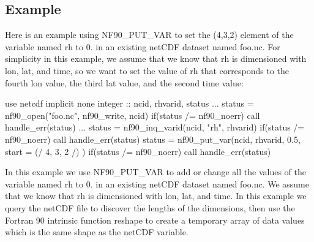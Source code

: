 \subsection*{Example}

Here is an example using N\+F90\+\_\+\+P\+U\+T\+\_\+\+V\+AR to set the (4,3,2) element of the variable named rh to 0. in an existing net\+C\+DF dataset named foo.\+nc. For simplicity in this example, we assume that we know that rh is dimensioned with lon, lat, and time, so we want to set the value of rh that corresponds to the fourth lon value, the third lat value, and the second time value\+:


\begin{DoxyCode}
\textcolor{keywordtype}{use }netcdf
\textcolor{keywordtype}{implicit none}
\textcolor{keywordtype}{integer} :: ncid, rhvarid, status
...
status = nf90\_open(\textcolor{stringliteral}{"foo.nc"}, nf90\_write, ncid)
\textcolor{keywordflow}{if}(status /= nf90\_noerr) \textcolor{keyword}{call }handle\_err(status)
...
status = nf90\_inq\_varid(ncid, \textcolor{stringliteral}{"rh"}, rhvarid)
\textcolor{keywordflow}{if}(status /= nf90\_noerr) \textcolor{keyword}{call }handle\_err(status)
status = nf90\_put\_var(ncid, rhvarid, 0.5, start = (/ 4, 3, 2 /) )
\textcolor{keywordflow}{if}(status /= nf90\_noerr) \textcolor{keyword}{call }handle\_err(status)
\end{DoxyCode}


In this example we use N\+F90\+\_\+\+P\+U\+T\+\_\+\+V\+AR to add or change all the values of the variable named rh to 0. in an existing net\+C\+DF dataset named foo.\+nc. We assume that we know that rh is dimensioned with lon, lat, and time. In this example we query the net\+C\+DF file to discover the lengths of the dimensions, then use the Fortran 90 intrinsic function reshape to create a temporary array of data values which is the same shape as the net\+C\+DF variable.


